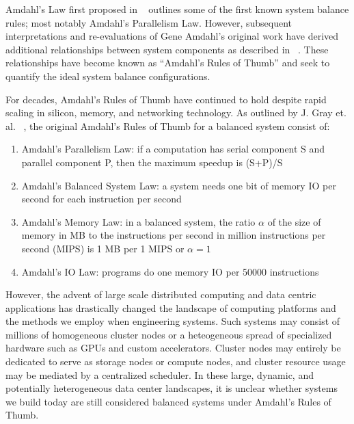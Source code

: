 \documentclass{sig-alternate}
\begin{document}

Amdahl's Law first proposed in ~\cite{Amdahl:1967:VSP:1465482.1465560} outlines some of the first known system balance rules; most notably Amdahl's Parallelism Law.
However, subsequent interpretations and re-evaluations of Gene Amdahl's original work have derived additional relationships between system components as described in ~\cite{Gustafson:1988:RAL:42411.42415, Hill:2008:ALM:1449375.1449387, export:68636, Bell:2006:PCS:1110638.1110681}.
These relationships have become known as ``Amdahl's Rules of Thumb'' and seek to quantify the ideal system balance configurations.

For decades, Amdahl's Rules of Thumb have continued to hold despite rapid scaling in silicon, memory, and networking technology.
As outlined by J. Gray et. al. ~\cite{export:68636}, the original Amdahl's Rules of Thumb for a balanced system consist of:
\begin{enumerate}
\item Amdahl's Parallelism Law: if a computation has serial component S and parallel component P, then the maximum speedup is (S+P)/S
\item Amdahl's Balanced System Law: a system needs one bit of memory IO per second for each instruction per second
\item Amdahl's Memory Law: in a balanced system, the ratio $\alpha$ of the size of memory in MB to the instructions per second in million instructions per second (MIPS) is 1 MB per 1 MIPS or $\alpha = 1$
\item Amdahl's IO Law: programs do one memory IO per 50000 instructions
\end{enumerate}
However, the advent of large scale distributed computing and data centric applications has drastically changed the landscape of computing platforms and the methods we employ when engineering systems.
Such systems may consist of millions of homogeneous cluster nodes or a heteogeneous spread of specialized hardware such as GPUs and custom accelerators.
Cluster nodes may entirely be dedicated to serve as storage nodes or compute nodes, and cluster resource usage may be mediated by a centralized scheduler.
In these large, dynamic, and potentially heterogeneous data center landscapes, it is unclear whether systems we build today are still considered balanced systems under Amdahl's Rules of Thumb.
\end{document}
